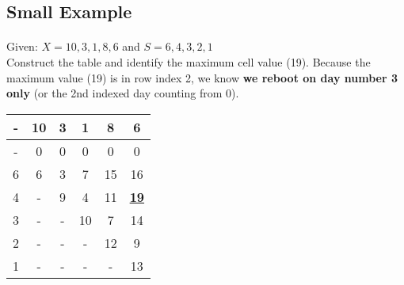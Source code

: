 \documentclass[12pt]{article}
\begin{document}
\subsection{Small Example}
\begin{minipage}{0.6\linewidth}
\paragraph{}
\noindent Given: $X = {10, 3, 1, 8, 6}$ and $S = {6, 4, 3, 2, 1}$ \\
Construct the table and identify the maximum cell value (19).
Because the maximum value (19) is in row index 2, we know \textbf{we reboot on day number 3 only} (or the 2nd indexed day counting from 0).
\end{minipage}
\hspace{0.05\linewidth}
\begin{minipage}{0.3\linewidth}
\begin{tabular}{|c|c|c|c|c|c|}
\hline
- & 10 & 3 & 1 & 8 & 6 \\ \hline
- & 0 & 0 & 0 & 0 & 0 \\
6 & 6 & 3 & 7 & 15 & 16 \\
4 & - & 9 & 4 & 11 & \underline{\textbf{19}} \\
3 & - & - & 10 & 7 & 14 \\
2 & - & - & - & 12 & 9 \\
1 & - & - & - & - & 13 \\
\hline
\end{tabular}
\end{minipage}
\end{document}
